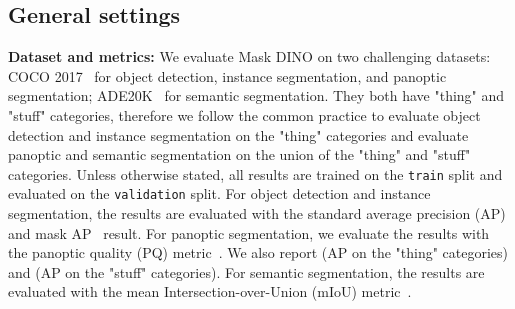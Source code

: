 \documentclass[10pt,twocolumn,letterpaper]{article}
\begin{document}
\subsection{General settings}\label{sec:generalimpl}
\textbf{Dataset and metrics: }We evaluate Mask DINO on two challenging datasets: COCO 2017~\cite{lin2015microsoft} for object detection, instance segmentation, and panoptic segmentation; ADE20K~\cite{zhou2017scene} for semantic segmentation. They both have "thing" and "stuff" categories, therefore we follow the common practice to evaluate object detection and instance segmentation on the "thing" categories and evaluate panoptic and semantic segmentation on the union of the "thing" and "stuff" categories. Unless otherwise stated, all results are trained on the \texttt{train} split and evaluated on the \texttt{validation} split. For object detection and instance segmentation, the results are evaluated with the standard average precision (AP) and mask AP~\cite{lin2015microsoft} result. For panoptic segmentation, we evaluate the results with the panoptic quality (PQ) metric~\cite{kirillov2019panoptic}. We also report  (AP on the "thing" categories) and  (AP on the "stuff" categories). For semantic segmentation, the results are evaluated with the mean Intersection-over-Union (mIoU) metric~\cite{everingham2015pascal}.
\end{document}
